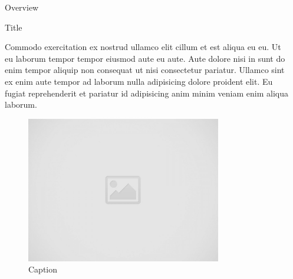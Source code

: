 \documentclass[final]{beamer}
\newlength{\sepwid}
\newlength{\onecolwid}
\begin{document}
\begin{frame}[t]
\begin{columns}[t]
\begin{column}{\onecolwid}
\begin{alertblock}{Overview}
        \end{alertblock}
        
        

        
        \begin{block}{Title}
        
            Commodo exercitation ex nostrud ullamco elit cillum et est aliqua eu eu. Ut eu laborum tempor tempor eiusmod aute eu aute. Aute dolore nisi in sunt do enim tempor aliquip non consequat ut nisi consectetur pariatur. Ullamco sint ex enim aute tempor ad laborum nulla adipisicing dolore proident elit. Eu fugiat reprehenderit et pariatur id adipisicing anim minim veniam enim aliqua laborum. \\[0.3in]
            

            \begin{figure}
                \includegraphics[width=0.8\textwidth,keepaspectratio]{images/placeholder.jpg}
                \caption{Caption}
            \end{figure}
        
        \end{block}
        
    
    \end{column} %
    
    \begin{column}{\sepwid}\end{column} %
    

\end{columns}
\end{frame}
\end{document}

